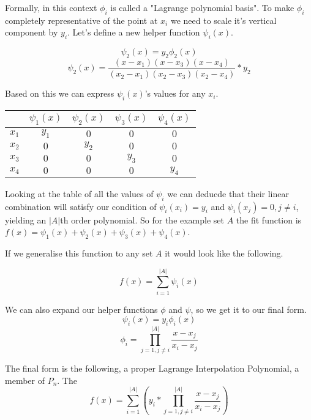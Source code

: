 \documentclass[12pt, titlepage]{article}
\begin{document}
Formally, in this context $\phi_i$ is called a "Lagrange polynomial basis".
To make $\phi_i$ completely representative of the point at $x_i$ we need to 
scale it's vertical component by $y_i$. Let's define a new helper 
function $\psi_i(x)$.

\begin{equation}
    \psi_2(x) = y_2 \phi_2(x)
\end{equation}
\begin{equation}
    \psi_2(x) = \frac{(x - x_1)(x - x_3)(x - x_4)}{(x_2 - x_1)(x_2 - x_3)(x_2 - x_4)} * y_2
\end{equation}

Based on this we can express $\psi_i(x)$'s values for any $x_i$.

{
\centering
\begin{tabular}{c|c c c c}
    & $\psi_1(x) $ & $\psi_2(x)$ & $\psi_3(x)$ & $\psi_4(x)$ \\
    \hline
    $x_1$ & $y_1$ & $0$ & $0$ & $0$ \\
    $x_2$ & $0$ & $y_2$ & $0$ & $0$ \\
    $x_3$ & $0$ & $0$ & $y_3$ & $0$ \\
    $x_4$ & $0$ & $0$ & $0$ & $y_4$ \\
\end{tabular}\par
}

Looking at the table of all the values of $\psi_i$ we can deducde that their linear
combination will satisfy our condition of $\psi_i(x_i) = y_i$ and 
$\psi_i(x_j) = 0, j \neq i$, yielding an $|A|$th order polynomial. 
So for the example set $A$ the fit function is 
$f(x) = \psi_1(x) + \psi_2(x) + \psi_3(x) + \psi_4(x)$.

If we generalise this function to any set $A$ it would look
like the following.

\begin{equation}
    f(x) = \sum_{i=1}^{|A|}\psi_i(x)
\end{equation}

We can also expand our helper functions $\phi$ and $\psi$, so we get it to our 
final form.
$$\psi_i(x) = y_i \phi_i(x)$$
\begin{equation}
    \phi_i = \prod_{j=1, j \neq i}^{|A|}\frac{x - x_j}{x_i - x_j}
\end{equation}

The final form is the following, a proper Lagrange Interpolation Polynomial,
a member of $P_n$. The 
\begin{equation}
f(x) = \sum_{i=1}^{|A|} \left(y_i * \prod_{j=1, j \neq i}^{|A|} \frac{x - x_j}{x_i - x_j}\right)
\end{equation}
\end{document}
